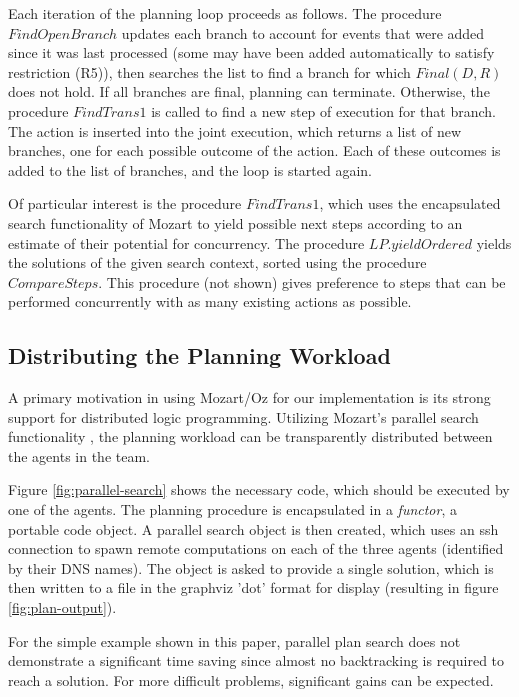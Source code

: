 Each iteration of the planning loop proceeds as follows. The procedure
$FindOpenBranch$ updates each branch to account for events that were
added since it was last processed (some may have been added automatically
to satisfy restriction (R5)), then searches the list to find a branch
for which $Final(D,R)$ does not hold. If all branches are final,
planning can terminate. Otherwise, the procedure $FindTrans1$ is
called to find a new step of execution for that branch. The action
is inserted into the joint execution, which returns a list of new
branches, one for each possible outcome of the action. Each of these
outcomes is added to the list of branches, and the loop is started
again.

Of particular interest is the procedure $FindTrans1$, which uses
the encapsulated search functionality of Mozart to yield possible
next steps according to an estimate of their potential for concurrency.
The procedure $LP.yieldOrdered$ yields the solutions of the given
search context, sorted using the procedure $CompareSteps$. This procedure
(not shown) gives preference to steps that can be performed concurrently
with as many existing actions as possible.


\subsection{Distributing the Planning Workload}

A primary motivation in using Mozart/Oz for our implementation is
its strong support for distributed logic programming. Utilizing Mozart's
parallel search functionality \citep{Schulte00constraint_services},
the planning workload can be transparently distributed between the
agents in the team. 

Figure \ref{fig:parallel-search} shows the necessary code, which
should be executed by one of the agents. The planning procedure is
encapsulated in a \emph{functor}, a portable code object. A parallel
search object is then created, which uses an ssh connection to spawn
remote computations on each of the three agents (identified by their
DNS names). The object is asked to provide a single solution, which
is then written to a file in the graphviz 'dot' format for display
(resulting in figure \ref{fig:plan-output}).

For the simple example shown in this paper, parallel plan search does
not demonstrate a significant time saving since almost no backtracking
is required to reach a solution. For more difficult problems, significant
gains can be expected.


